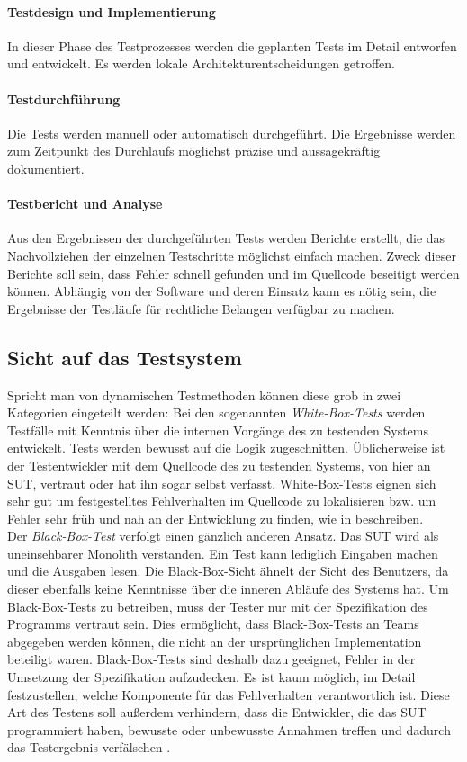 \paragraph{Testdesign und Implementierung} In dieser Phase des Testprozesses werden die geplanten Tests im Detail entworfen und entwickelt. Es werden lokale Architekturentscheidungen getroffen.

\paragraph{Testdurchführung} Die Tests werden manuell oder automatisch durchgeführt. Die Ergebnisse werden zum Zeitpunkt des Durchlaufs möglichst präzise und aussagekräftig dokumentiert.

\paragraph{Testbericht und Analyse} Aus den Ergebnissen der durchgeführten Tests werden Berichte erstellt, die das Nachvollziehen der einzelnen Testschritte möglichst einfach machen. Zweck dieser Berichte soll sein, dass Fehler schnell gefunden und im Quellcode beseitigt werden können. Abhängig von der Software und deren Einsatz kann es nötig sein, die Ergebnisse der Testläufe für rechtliche Belangen verfügbar zu machen.

\subsection{Sicht auf das Testsystem}
\label{sec:sicht}
Spricht man von dynamischen Testmethoden können diese grob in zwei Kategorien eingeteilt werden: Bei den sogenannten \textit{White-Box-Tests} werden Testfälle mit Kenntnis über die internen Vorgänge des zu testenden Systems entwickelt. Tests werden bewusst auf die Logik zugeschnitten. Üblicherweise ist der Testentwickler mit dem Quellcode des zu testenden Systems, von hier an \gls{SUT}, vertraut oder hat ihn sogar selbst verfasst. White-Box-Tests eignen sich sehr gut um festgestelltes Fehlverhalten im Quellcode zu lokalisieren bzw. um Fehler sehr früh und nah an der Entwicklung zu finden, wie \citeauthor{spillner_basiswissen_2012} in \cite{spillner_basiswissen_2012} beschreiben.\\
Der \textit{Black-Box-Test} verfolgt einen gänzlich anderen Ansatz. Das \Gls{SUT} wird als uneinsehbarer Monolith verstanden. Ein Test kann lediglich Eingaben machen und die Ausgaben lesen. Die Black-Box-Sicht ähnelt der Sicht des Benutzers, da dieser ebenfalls keine Kenntnisse über die inneren Abläufe des Systems hat. Um Black-Box-Tests zu betreiben, muss der Tester nur mit der Spezifikation des Programms vertraut sein. Dies ermöglicht, dass Black-Box-Tests an Teams abgegeben werden können, die nicht an der ursprünglichen Implementation beteiligt waren. Black-Box-Tests sind deshalb dazu geeignet, Fehler in der Umsetzung der Spezifikation aufzudecken. Es ist kaum möglich, im Detail festzustellen, welche Komponente für das Fehlverhalten verantwortlich ist. Diese Art des Testens soll außerdem verhindern, dass die Entwickler, die das \gls{SUT} programmiert haben, bewusste oder unbewusste Annahmen treffen und dadurch das Testergebnis verfälschen \cite{spillner_basiswissen_2012}.  

